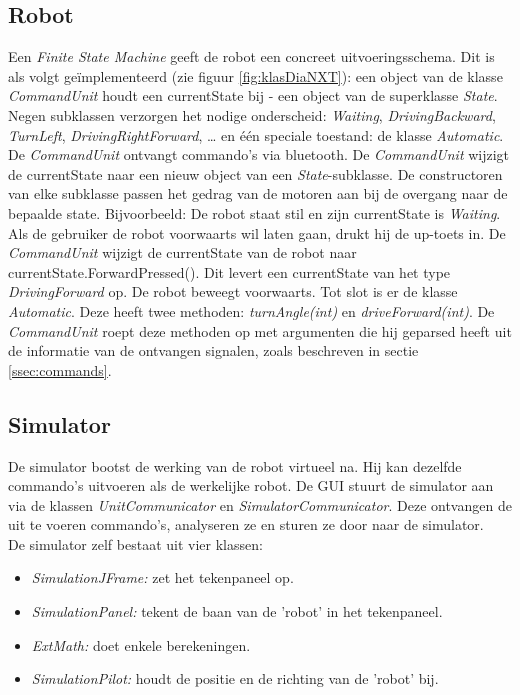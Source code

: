 \documentclass[tt1]{penoverslag}
\begin{document}
\subsection{Robot}
\label{ssec:robot}
Een \textit{Finite State Machine} geeft de robot een concreet uitvoeringsschema. Dit is als volgt ge\"implementeerd (zie figuur \ref{fig:klasDiaNXT}): een object van de klasse \textit{CommandUnit} houdt een currentState bij - een object van de superklasse \textit{State}. Negen subklassen verzorgen het nodige onderscheid: \textit{Waiting}, \textit{DrivingBackward}, \textit{TurnLeft}, \textit{DrivingRightForward}, …  en \'e\'en speciale toestand: de klasse \textit{Automatic}. De \textit{CommandUnit} ontvangt commando's via bluetooth. De \textit{CommandUnit} wijzigt de currentState naar een nieuw object van een \textit{State}-subklasse. De constructoren van elke subklasse passen het gedrag van de motoren aan bij de overgang naar de bepaalde state.
Bijvoorbeeld: De robot staat stil en zijn currentState is \textit{Waiting}.
Als de gebruiker de robot voorwaarts wil laten gaan, drukt hij de up-toets in. De \textit{CommandUnit} wijzigt de currentState van de robot naar currentState.ForwardPressed(). Dit levert een currentState van het type \textit{DrivingForward} op. De robot beweegt voorwaarts.
Tot slot is er de klasse \textit{Automatic}. Deze heeft twee methoden: \textit{turnAngle(int)} en \textit{driveForward(int)}. De \textit{CommandUnit} roept deze methoden op met argumenten die hij geparsed heeft uit de informatie van de ontvangen signalen, zoals beschreven in sectie \ref{ssec:commands}.

\subsection{Simulator}
\label{ssec:simulator}
De simulator bootst de werking van de robot virtueel na. Hij kan dezelfde commando's uitvoeren als de werkelijke robot. De GUI stuurt de simulator aan via de klassen \textit{UnitCommunicator} en \textit{SimulatorCommunicator}. Deze ontvangen de uit te voeren commando's, analyseren ze en sturen ze door naar de simulator.
\\
De simulator zelf bestaat uit vier klassen:

\begin{itemize}
\item \textit{SimulationJFrame:} zet het tekenpaneel op.
\item \textit{SimulationPanel:} tekent de baan van de 'robot' in het tekenpaneel.
\item \textit{ExtMath:} doet enkele berekeningen.
\item \textit{SimulationPilot:} houdt de positie en de richting van de 'robot' bij.
\end{itemize}
\end{document}
